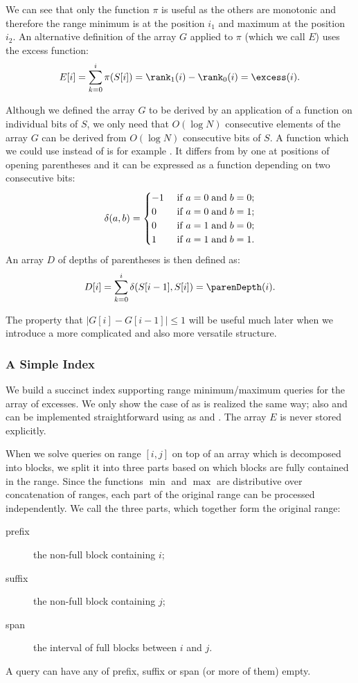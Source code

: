 We can see that only the function $\pi$ is useful as the others are monotonic and therefore the range minimum is at the position $i_1$ and maximum at the position $i_2$.
An alternative definition of the array $G$ applied to $\pi$ (which we call $E$) uses the excess function:
$$ E[i] = \sum_{k=0}^i \pi(S[i]) = \rank_1(i) - \rank_0(i) = \excess(i). $$

\bigbreak

Although we defined the array $G$ to be derived by an application of a function on individual bits of $S$, we only need that $O(\log N)$ consecutive elements of the array $G$ can be derived from $O(\log N)$ consecutive bits of $S$.
A function which we could use instead of \excess{} is for example \parenDepth{}.
It differs from \excess{} by one at positions of opening parentheses and it can be expressed as a function depending on two consecutive bits:
$$\delta(a, b) = 
\begin{cases}
	-1 &\ \textrm{if}\  a = 0 \mathrel{\textrm{and}} b = 0; \\
	0 &\ \textrm{if}\  a = 0 \mathrel{\textrm{and}} b = 1; \\
	0 &\ \textrm{if}\  a = 1 \mathrel{\textrm{and}} b = 0; \\
	1 &\ \textrm{if}\  a = 1 \mathrel{\textrm{and}} b = 1.
\end{cases} $$
An array $D$ of depths of parentheses is then defined as:
$$ D[i] = \sum_{k=0}^i \delta(S[i - 1], S[i]) = \parenDepth(i).$$

The property that $| G[i] - G[i-1] | \le 1$ will be useful much later when we introduce a more complicated and also more versatile structure.

\subsubsection{A Simple Index}\label{sss:rmq-index}

We build a succinct index supporting range minimum/maximum queries for the array of excesses.
We only show the case of \rmqi{} as \RMQi{} is realized the same way; also \rmq{} and \RMQ{} can be implemented straightforward using \rmqi{} as \RMQi{} and \excess{}.
The array $E$ is never stored explicitly.

When we solve queries on range $[i, j]$ on top of an array which is decomposed into blocks, we split it into three parts based on which blocks are fully contained in the range.
Since the functions $\min$ and $\max$ are distributive over concatenation of ranges, each part of the original range can be processed independently.
We call the three parts, which together form the original range:
\begin{description}
	\item[prefix] the non-full block containing $i$;
	\item[suffix] the non-full block containing $j$;
	\item[span] the interval of full blocks between $i$ and $j$.
\end{description}
A query can have any of prefix, suffix or span (or more of them) empty.

